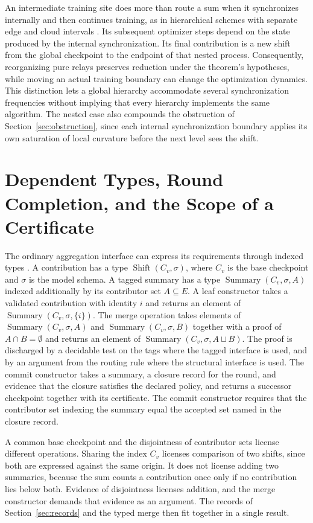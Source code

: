 \documentclass[11pt]{article}
\theoremstyle{definition}
\theoremstyle{remark}
\begin{document}
An intermediate training site does more than route a sum when it synchronizes internally and then continues training, as in hierarchical schemes with separate edge and cloud intervals \cite{liu2020}. Its subsequent optimizer steps depend on the state produced by the internal synchronization. Its final contribution is a new shift from the global checkpoint to the endpoint of that nested process. Consequently, reorganizing pure relays preserves reduction under the theorem's hypotheses, while moving an actual training boundary can change the optimization dynamics. This distinction lets a global hierarchy accommodate several synchronization frequencies without implying that every hierarchy implements the same algorithm. The nested case also compounds the obstruction of Section~\ref{sec:obstruction}, since each internal synchronization boundary applies its own saturation of local curvature before the next level sees the shift.

\section{Dependent Types, Round Completion, and the Scope of a Certificate}\label{sec:dependent}

The ordinary aggregation interface can express its requirements through indexed types \cite{martinlof1984,hottbook2013}. A contribution has a type $\operatorname{Shift}(C_v,\sigma)$, where $C_v$ is the base checkpoint and $\sigma$ is the model schema. A tagged summary has a type $\operatorname{Summary}(C_v,\sigma,A)$ indexed additionally by its contributor set $A\subseteq E$. A leaf constructor takes a validated contribution with identity $i$ and returns an element of $\operatorname{Summary}(C_v,\sigma,\{i\})$. The merge operation takes elements of $\operatorname{Summary}(C_v,\sigma,A)$ and $\operatorname{Summary}(C_v,\sigma,B)$ together with a proof of $A\cap B=\emptyset$ and returns an element of $\operatorname{Summary}(C_v,\sigma,A\sqcup B)$. The proof is discharged by a decidable test on the tags where the tagged interface is used, and by an argument from the routing rule where the structural interface is used. The commit constructor takes a summary, a closure record for the round, and evidence that the closure satisfies the declared policy, and returns a successor checkpoint together with its certificate. The commit constructor requires that the contributor set indexing the summary equal the accepted set named in the closure record.

A common base checkpoint and the disjointness of contributor sets license different operations. Sharing the index $C_v$ licenses comparison of two shifts, since both are expressed against the same origin. It does not license adding two summaries, because the sum counts a contribution once only if no contribution lies below both. Evidence of disjointness licenses addition, and the merge constructor demands that evidence as an argument. The records of Section~\ref{sec:records} and the typed merge then fit together in a single result.
\end{document}
